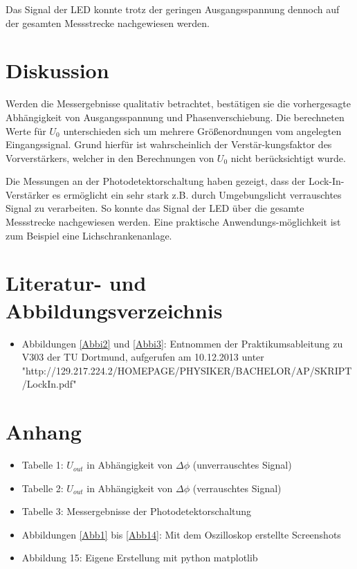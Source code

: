 \documentclass[11pt]{article}
\begin{document}
\noindent
Das Signal der LED konnte trotz der geringen Ausgangsspannung dennoch auf der gesamten Messstrecke nachgewiesen werden. 


\section{Diskussion}
Werden die Messergebnisse qualitativ betrachtet, best\"atigen sie die vorhergesagte Abh\"angigkeit von Ausgangsspannung und Phasenverschiebung. Die berechneten Werte f\"ur $U_0$ unterschieden sich um mehrere Gr\"o\ss enordnungen vom angelegten Eingangssignal. Grund hierf\"ur ist wahrscheinlich der Verst\"ar-kungsfaktor des Vorverst\"arkers, welcher in den Berechnungen von $U_0$ nicht ber\"ucksichtigt wurde. 

\noindent
Die Messungen an der Photodetektorschaltung haben gezeigt, dass der Lock-In-Verst\"arker es erm\"oglicht ein sehr stark z.B. durch Umgebungslicht verrauschtes Signal zu verarbeiten. So konnte das Signal der LED \"uber die gesamte Messstrecke nachgewiesen werden. Eine praktische Anwendungs-m\"oglichkeit ist zum Beispiel eine Lichschrankenanlage.
\section{Literatur- und Abbildungsverzeichnis}
\begin{itemize}
\item Abbildungen \ref{Abbi2} und \ref{Abbi3}: Entnommen der Praktikumsableitung zu V303 der TU Dortmund, aufgerufen am 10.12.2013 unter \newline "http://129.217.224.2/HOMEPAGE/PHYSIKER/BACHELOR/AP/SKRIPT/LockIn.pdf"
\end{itemize}
\section{Anhang}
\begin{itemize}
\item Tabelle 1: $U_{out}$ in Abhängigkeit von $\Delta\phi$ (unverrauschtes Signal)
\item Tabelle 2: $U_{out}$ in Abhängigkeit von $\Delta\phi$ (verrauschtes Signal)
\item Tabelle 3: Messergebnisse der Photodetektorschaltung
\item Abbildungen \ref{Abb1} bis \ref{Abb14}: Mit dem Oszilloskop erstellte Screenshots
\item Abbildung 15: Eigene Erstellung mit python matplotlib
 
\end{itemize}
\newpage
\end{document}
